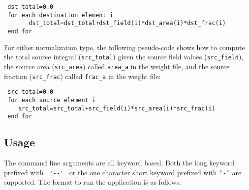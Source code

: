 \begin{verbatim}
 dst_total=0.0
 for each destination element i
       dst_total=dst_total+dst_field(i)*dst_area(i)*dst_frac(i)
 end for
\end{verbatim}

For either normalization type, the following pseudo-code shows how to compute the total source integral ({\tt src\_total}) given the source field values ({\tt src\_field}), the source area ({\tt src\_area}) called {\tt area\_a} in the weight file, and the source fraction ({\tt src\_frac}) called {\tt frac\_a} in the weight file:

\begin{verbatim}
 src_total=0.0
 for each source element i
    src_total=src_total+src_field(i)*src_area(i)*src_frac(i)
 end for
\end{verbatim}


\subsection{Usage}\label{sec:regridusage}

The command line arguments are all keyword based.  Both the long keyword prefixed with \verb+ '--' + or the
one character short keyword prefixed with {\tt '-'} are supported.  The format to run the application is
as follows:

